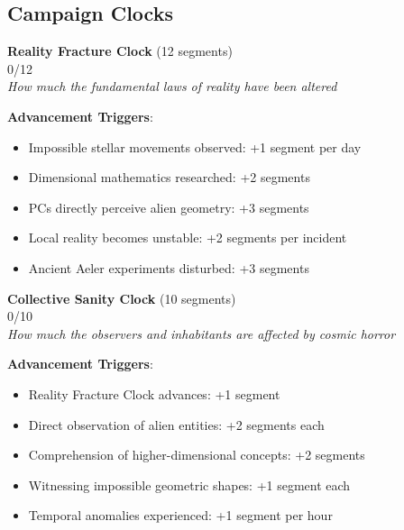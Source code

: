 \documentclass[11pt]{article}
\newcommand{\clocksegment}{\textbullet}
\begin{document}
\subsection*{Campaign Clocks}

\begin{center}
\textbf{Reality Fracture Clock} (12 segments)\\
\fbox{\clocksegment\clocksegment\clocksegment\clocksegment\clocksegment\clocksegment\clocksegment\clocksegment\clocksegment\clocksegment\clocksegment\clocksegment} 0/12\\
\textit{How much the fundamental laws of reality have been altered}
\end{center}

\textbf{Advancement Triggers}:
\begin{itemize}[leftmargin=*]
\item Impossible stellar movements observed: +1 segment per day
\item Dimensional mathematics researched: +2 segments
\item PCs directly perceive alien geometry: +3 segments
\item Local reality becomes unstable: +2 segments per incident
\item Ancient Aeler experiments disturbed: +3 segments
\end{itemize}

\begin{center}
\textbf{Collective Sanity Clock} (10 segments)\\
\fbox{\clocksegment\clocksegment\clocksegment\clocksegment\clocksegment\clocksegment\clocksegment\clocksegment\clocksegment\clocksegment} 0/10\\
\textit{How much the observers and inhabitants are affected by cosmic horror}
\end{center}

\textbf{Advancement Triggers}:
\begin{itemize}[leftmargin=*]
\item Reality Fracture Clock advances: +1 segment
\item Direct observation of alien entities: +2 segments each
\item Comprehension of higher-dimensional concepts: +2 segments
\item Witnessing impossible geometric shapes: +1 segment each
\item Temporal anomalies experienced: +1 segment per hour
\end{itemize}
\end{document}
